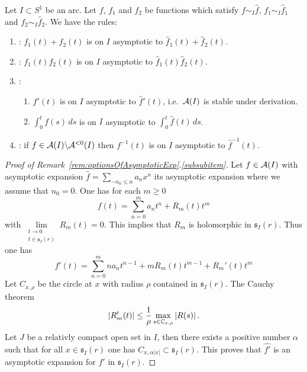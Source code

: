 \begin{rem}\label{rem:optionsOfAsymptoticExp}
  Let $I\subset S^1$ be an arc.
  Let $f$, $f_1$ and $f_2$ be functions which satisfy $f\sim_I\hat f$,
  $f_1\sim_I\hat f_1$ and $f_2\sim_I\hat f_2$.
  We have the rules:
  \begin{enumerate}
    \item \cite[4.5.Thm.13]{Balser2000Formal}:
      $f_1(t)+f_2(t)$ is on $I$ asymptotic to $\hat f_1(t)+\hat f_2(t)$.
    \item \cite[4.5.Thm.14]{Balser2000Formal}:
      $f_1(t)f_2(t)$ is on $I$ asymptotic to $\hat f_1(t)\hat f_2(t)$.
    \item \cite[4.5.Thm.20]{Balser2000Formal}:
      \begin{enumerate}
        \item\label{subsubitem}
          $f'(t)$ is on $I$ asymptotic to $\hat f'(t)$, i.e.\ $\mathcal{A}(I)$ is
          stable under derivation.
        \item $\int_0^tf(s)\,ds$ is on $I$ asymptotic to $\int_0^t\hat f(t)\,ds$.
      \end{enumerate}
    \item \cite[4.5.Thm.21]{Balser2000Formal}:
      if $f\in\mathcal{A}(I)\backslash\mathcal{A}^{<0}(I)$ then
      $f^{-1}(t)$ is on $I$ asymptotic to $\hat f^{-1}(t)$.
  \end{enumerate}
\end{rem}
\begin{proof}[Proof of Remark~\ref{rem:optionsOfAsymptoticExp}.\ref{subsubitem}]
  Let $f\in\mathcal{A}(I)$ with asymptotic expansion $\hat f=\sum_{-n_0\leq n}a_nx^n$
  its asymptotic expansion where we assume that $n_0=0$.
  One has for each $m\geq0$
  \[
    f(t)=\sum_{n=0}^ma_nt^n+R_m(t)t^m
  \]
  with $\underset{\substack{t\to0\\t\in\mathfrak{s}_I(r)}}{\lim}R_m(t)=0$.
  This implies that $R_m$ is holomorphic in $\mathfrak{s}_I(r)$.
  Thus one has
  \[
    f'(t)=\sum_{n=0}^mna_nt^{n-1}+mR_m(t)t^{m-1}+R_m'(t)t^m
  \]
  Let $C_{x,\rho}$ be the circle at $x$ with radius $\rho$ contained in
  $\mathfrak{s}_I(r)$. The Cauchy theorem 
  \[
    |R_m'(t)|\leq\frac{1}{\rho}\max_{s\in\mathbb{C}_{x,\rho}}|R(s)| \,.
  \]
  Let $J$ be a relativly compact open set in $I$, then there exists a positive
  number $\alpha$ such that for all $x\in\mathfrak{s}_I(r)$ one has
  $C_{x,\alpha|x|}\subset\mathfrak{s}_I(r)$.
  \TODO{}
  This proves that $\hat{f'}$ is an asymptotic expansion for $f'$ in
  $\mathfrak{s}_I(r)$.
\end{proof}

